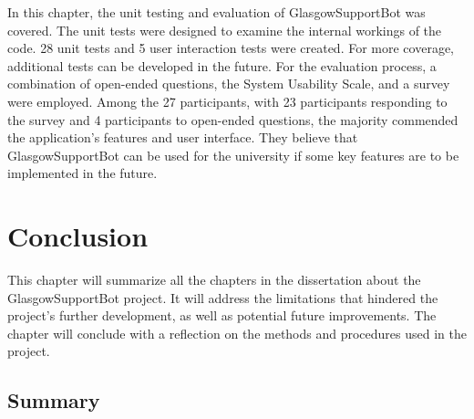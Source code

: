 \documentclass{l4proj}
\begin{document}
In this chapter, the unit testing and evaluation of GlasgowSupportBot was covered. The unit tests were designed to examine the internal workings of the code. 28 unit tests and 5 user interaction tests were created. For more coverage, additional tests can be developed in the future. For the evaluation process, a combination of open-ended questions, the System Usability Scale, and a survey were employed. Among the 27 participants, with 23 participants responding to the survey and 4 participants to open-ended questions, the majority commended the application's features and user interface. They believe that GlasgowSupportBot can be used for the university if some key features are to be implemented in the future. 



\chapter{Conclusion}   

This chapter will summarize all the chapters in the dissertation about the GlasgowSupportBot project. It will address the limitations that hindered the project's further development, as well as potential future improvements. The chapter will conclude with a reflection on the methods and procedures used in the project.

\section{Summary}
\end{document}
